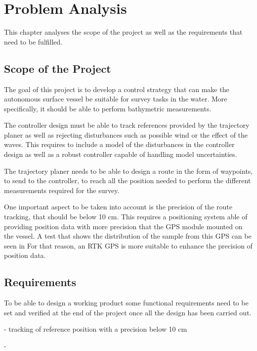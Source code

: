 \chapter{Problem Analysis}
This chapter analyses the scope of the project as well as the requirements that need to be fulfilled.

\section{Scope of the Project}
The goal of this project is to develop a control strategy that can make the autonomous surface vessel be suitable for survey tasks in the water. More specifically, it should be able to perform bathymetric measurements.

The controller design must be able to track references provided by the trajectory planer as well as rejecting disturbances such as possible wind or the effect of the waves. This requires to include a model of the disturbances in the controller design as well as a robust controller capable of handling model uncertainties.

The trajectory planer needs to be able to design a route in the form of waypoints, to send to the controller, to reach all the position needed to perform the different measurements required for the survey. 

One important aspect to be taken into account is the precision of the route tracking, that should be below 10 cm. This requires a positioning system able of providing position data with more precision that the GPS module mounted on the vessel. A test that shows the distribution of the sample from this GPS can be seen in  For that reason, an RTK GPS is more suitable to enhance the precision of position data.


\section{Requirements} \label{sec:requirements}
To be able to design a working product some functional requirements need to be set and verified at the end of the project once all the design has been carried out.

- tracking of reference position with a precision below 10 cm

- 

